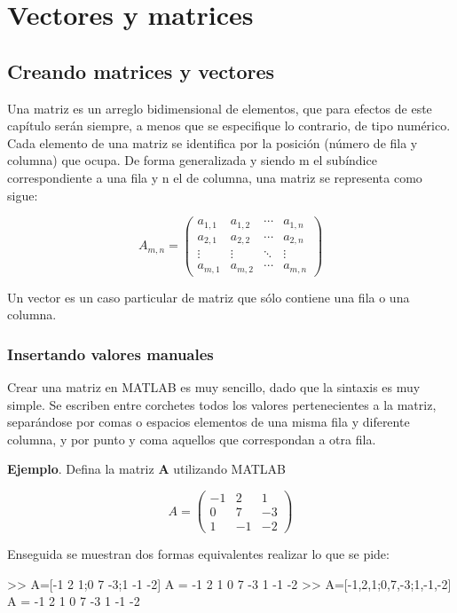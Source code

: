\chapter{Vectores y matrices}

\section{Creando matrices y vectores}

Una matriz es un arreglo bidimensional de elementos, que para efectos de
este capítulo serán siempre, a menos que se especifique lo contrario, de
tipo numérico. Cada elemento de una matriz se identifica por la posición
(número de fila y columna) que ocupa. De forma generalizada y siendo m
el subíndice correspondiente a una fila y n el de columna, una matriz se
representa como sigue:

$$
A_{m,n} = 
\begin{pmatrix}
a_{1,1} & a_{1,2} & \cdots & a_{1,n} \\
a_{2,1} & a_{2,2} & \cdots & a_{2,n} \\
\vdots  & \vdots  & \ddots & \vdots  \\
a_{m,1} & a_{m,2} & \cdots & a_{m,n} 
\end{pmatrix}
$$

Un vector es un caso particular de matriz que sólo contiene una fila o
una columna.

\subsection{Insertando valores
manuales}\label{insertando-valores-manuales}

Crear una matriz en MATLAB es muy sencillo, dado que la sintaxis es muy
simple. Se escriben entre corchetes todos los valores pertenecientes a
la matriz, separándose por comas o espacios elementos de una misma fila
y diferente columna, y por punto y coma aquellos que correspondan a otra
fila.

\textbf{Ejemplo}. Defina la matriz \textbf{A} utilizando MATLAB

$$
A = 
\begin{pmatrix}
    -1 & 2 & 1 \\
    0 & 7 & -3 \\
    1 & -1 & -2
\end{pmatrix}
$$

Enseguida se muestran dos formas equivalentes realizar lo que se pide:

\begin{matlab}
>> A=[-1 2 1;0 7 -3;1 -1 -2]
A =
    -1     2     1
     0     7    -3
     1    -1    -2
>> A=[-1,2,1;0,7,-3;1,-1,-2]
A =
    -1     2     1
     0     7    -3
     1    -1    -2
\end{matlab}

